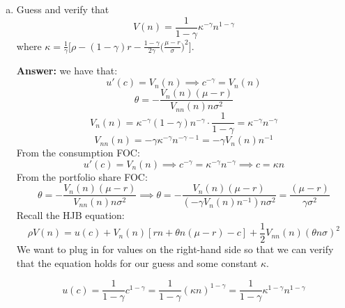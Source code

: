 \documentclass[11pt]{extarticle}
\theoremstyle{plain}
\theoremstyle{definition}
\begin{document}
\begin{enumerate}[(a)]
\item Guess and verify that 
\begin{equation*}
	V(n) = \frac{1}{1-\gamma} \kappa^{-\gamma} n^{1-\gamma}
\end{equation*}
where $\kappa = \frac{1}{\gamma} \Big[ \rho - (1-\gamma)r - \frac{1-\gamma}{2\gamma} \Big( \frac{\mu-r}{\sigma} \Big)^2 \Big]$. 

\textbf{Answer:} we have that:
     \[
     u'(c) = V_n(n) \implies c^{-\gamma} = V_n(n)
     \]
     \[
     \theta = -\frac{V_n(n) (\mu - r)}{V_{nn}(n) n \sigma^2}
     \]
   \[
   V_n(n) = \kappa^{-\gamma} (1 - \gamma) n^{-\gamma} \cdot \frac{1}{1 - \gamma} = \kappa^{-\gamma} n^{-\gamma}
   \]
   \[
   V_{nn}(n) = -\gamma \kappa^{-\gamma} n^{-\gamma - 1} = -\gamma V_n(n) n^{-1}
   \]
From the consumption FOC:
\[
u'(c) = V_n(n) \implies c^{-\gamma} = \kappa^{-\gamma} n^{-\gamma} \implies c = \kappa n
\]
From the portfolio share FOC:
\[
\theta = -\frac{V_n(n) (\mu - r)}{V_{nn}(n) n \sigma^2} \implies \theta = -\frac{V_n(n) (\mu - r)}{ \left( -\gamma V_n(n) n^{-1} \right) n \sigma^2 } = \frac{(\mu - r)}{\gamma \sigma^2}
\]
Recall the HJB equation:
\[
\rho V(n) = u(c) + V_n(n) \left[ r n + \theta n (\mu - r) - c \right] + \frac{1}{2} V_{nn}(n) \left( \theta n \sigma \right)^2
\]
We want to plug in for values on the right-hand side so that we can verify that the equation holds for our guess and some constant $\kappa$.

   \[
   u(c) = \frac{1}{1 - \gamma} c^{1 - \gamma} = \frac{1}{1 - \gamma} (\kappa n)^{1 - \gamma} = \frac{1}{1 - \gamma} \kappa^{1 - \gamma} n^{1 - \gamma}
   \]


\end{enumerate}
\end{document}
